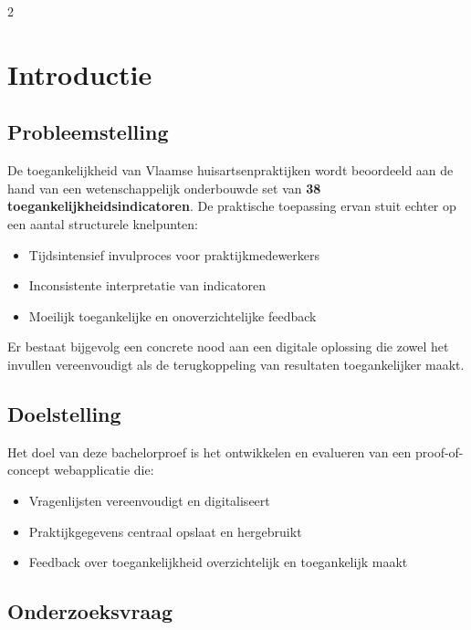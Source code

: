 \documentclass[a0,portrait]{hogent-poster}
\begin{document}
\begin{multicols}{2} %

\section{Introductie}
\subsection{Probleemstelling}
 
De toegankelijkheid van Vlaamse huisartsenpraktijken wordt beoordeeld aan de hand van een wetenschappelijk onderbouwde set van \textbf{38 toegankelijkheidsindicatoren}. 
De praktische toepassing ervan stuit echter op een aantal structurele knelpunten:
 
\begin{itemize}
  \item Tijdsintensief invulproces voor praktijkmedewerkers
  \item Inconsistente interpretatie van indicatoren
  \item Moeilijk toegankelijke en onoverzichtelijke feedback
\end{itemize}
 
Er bestaat bijgevolg een concrete nood aan een digitale oplossing die zowel het invullen vereenvoudigt als de terugkoppeling van resultaten toegankelijker maakt.

\subsection{Doelstelling}

Het doel van deze bachelorproef is het ontwikkelen en evalueren van een proof-of-concept webapplicatie die:
 
\begin{itemize}
  \item Vragenlijsten vereenvoudigt en digitaliseert
  \item Praktijkgegevens centraal opslaat en hergebruikt
  \item Feedback over toegankelijkheid overzichtelijk en toegankelijk maakt
\end{itemize}
 
\subsection{Onderzoeksvraag}
 

\end{multicols}
\end{document}
